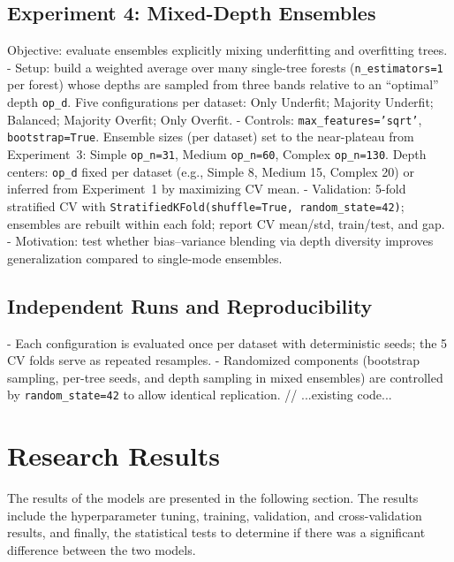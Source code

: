 \documentclass[conference]{IEEEtran}
\begin{document}
\subsection{Experiment 4: Mixed-Depth Ensembles}
Objective: evaluate ensembles explicitly mixing underfitting and overfitting trees.
- Setup: build a weighted average over many single-tree forests (\texttt{n\_estimators=1} per forest) whose depths are sampled from three bands relative to an “optimal” depth \texttt{op\_d}. Five configurations per dataset:
  Only Underfit; Majority Underfit; Balanced; Majority Overfit; Only Overfit.
- Controls: \texttt{max\_features='sqrt'}, \texttt{bootstrap=True}. 
  Ensemble sizes (per dataset) set to the near-plateau from Experiment~3: Simple \texttt{op\_n=31}, Medium \texttt{op\_n=60}, Complex \texttt{op\_n=130}. 
  Depth centers: \texttt{op\_d} fixed per dataset (e.g., Simple 8, Medium 15, Complex 20) or inferred from Experiment~1 by maximizing CV mean.
- Validation: 5-fold stratified CV with \texttt{StratifiedKFold(shuffle=True, random\_state=42)}; ensembles are rebuilt within each fold; report CV mean/std, train/test, and gap.
- Motivation: test whether bias–variance blending via depth diversity improves generalization compared to single-mode ensembles.

\subsection{Independent Runs and Reproducibility}
- Each configuration is evaluated once per dataset with deterministic seeds; the 5 CV folds serve as repeated resamples. 
- Randomized components (bootstrap sampling, per-tree seeds, and depth sampling in mixed ensembles) are controlled by \texttt{random\_state=42} to allow identical replication.
// ...existing code...

\section{Research Results}
The results of the models are presented in the following section. The results include the hyperparameter tuning, training, validation, and
 cross-validation results, and finally, the statistical tests to determine if there was a significant difference between the two models.
\end{document}
